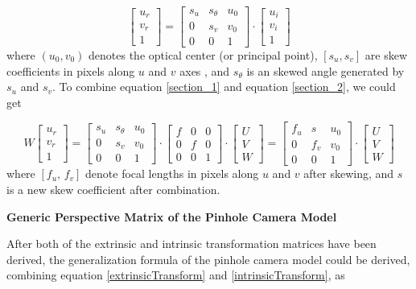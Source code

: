 \begin{equation}
%
\left[ \begin{array}{c} u_r \\ v_r \\ 1 \end{array} \right] %
=  \begin{bmatrix} s_u & s_\theta & u_0 \\ 0 & s_v & v_0 \\ 0 & 0 & 1 \end{bmatrix} \cdot %
\left[ \begin{array}{c} u_i \\ v_i \\ 1 \end{array} \right]%
\label{section_2}
\end{equation}%
where \((u_0, v_0)\) denotes the optical center (or principal point), \([s_u, s_v]\) are skew coefficients in pixels along \(u\) and  \(v\) axes , and  \(s_\theta\) is an skewed angle generated by \(s_u\) and  \(s_v\). To combine equation \ref{section_1} and equation \ref{section_2}, we could get %

\begin{equation}
%
W \left[ \begin{array}{c} u_r \\ v_r \\ 1 \end{array} \right] %
=  \begin{bmatrix} s_u & s_\theta & u_0 \\ 0 & s_v & v_0 \\ 0 & 0 & 1 \end{bmatrix} \cdot%
 \begin{bmatrix} f & 0 & 0 \\ 0 & f & 0 \\ 0 & 0 & 1 \end{bmatrix} \cdot %
\left[ \begin{array}{c} U \\ V \\ W \end{array} \right]%
=  \begin{bmatrix} f_u & s & u_0 \\ 0 & f_v & v_0 \\ 0 & 0 & 1 \end{bmatrix} \cdot%
\left[ \begin{array}{c} U \\ V \\ W \end{array} \right]%
%
\label{intrinsicTransform}
\end{equation}%
%
where \([f_u,\, f_v]\) denote focal lengths in pixels along \(u\) and \(v\) after skewing, and \(s\) is a new skew coefficient after combination.\\\par%
%
\textbf{Generic Perspective Matrix of the Pinhole Camera Model}\par%
After both of the extrinsic and intrinsic transformation matrices have been derived, the generalization formula of the pinhole camera model could be derived, combining equation \ref{extrinsicTransform} and \ref{intrinsicTransform}, as

